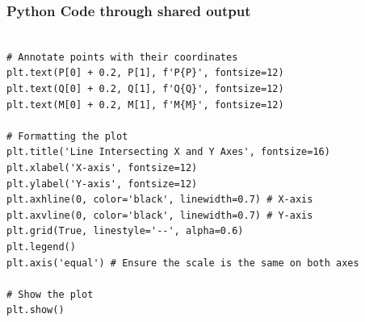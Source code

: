 \documentclass{beamer}
\begin{document}
\begin{frame}[fragile]
	\frametitle{Python Code through shared output}
	\begin{lstlisting}

# Annotate points with their coordinates
plt.text(P[0] + 0.2, P[1], f'P{P}', fontsize=12)
plt.text(Q[0] + 0.2, Q[1], f'Q{Q}', fontsize=12)
plt.text(M[0] + 0.2, M[1], f'M{M}', fontsize=12)

# Formatting the plot
plt.title('Line Intersecting X and Y Axes', fontsize=16)
plt.xlabel('X-axis', fontsize=12)
plt.ylabel('Y-axis', fontsize=12)
plt.axhline(0, color='black', linewidth=0.7) # X-axis
plt.axvline(0, color='black', linewidth=0.7) # Y-axis
plt.grid(True, linestyle='--', alpha=0.6)
plt.legend()
plt.axis('equal') # Ensure the scale is the same on both axes

# Show the plot
plt.show()
\end{lstlisting}
\end{frame}
\end{document}

